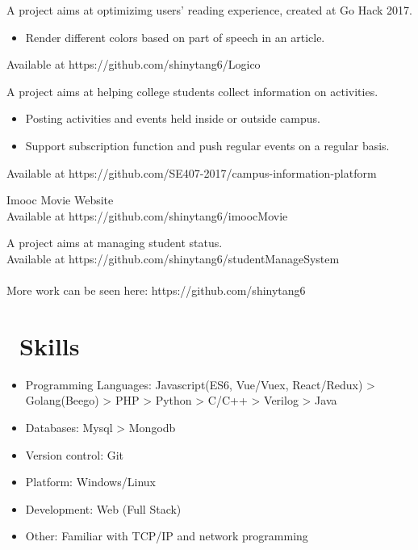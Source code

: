 \documentclass{resume}
\begin{document}
A project aims at optimizimg users' reading experience, created at Go Hack 2017.
\begin{itemize}
  \item Render different colors based on part of speech in an article.
\end{itemize}
Available at https://github.com/shinytang6/Logico


A project aims at helping college students collect information on activities.\begin{itemize}
  \item Posting activities and events held inside or outside campus.
  \item Support subscription function and push regular events on a regular basis.
\end{itemize}
Available at https://github.com/SE407-2017/campus-information-platform



Imooc Movie Website\\
Available at https://github.com/shinytang6/imoocMovie


A project aims at managing student status.\\
Available at https://github.com/shinytang6/studentManageSystem
\\
\\
More work can be seen here: https://github.com/shinytang6


\section{\faCogs\ Skills}
\begin{itemize}[parsep=0.5ex]
  \item Programming Languages: Javascript(ES6, Vue/Vuex, React/Redux) > Golang(Beego) > PHP > Python > C/C++ > Verilog > Java
  \item Databases: Mysql > Mongodb
  \item Version control: Git
  \item Platform: Windows/Linux
  \item Development: Web (Full Stack)
  \item Other: Familiar with TCP/IP and network programming
\end{itemize}
\end{document}
